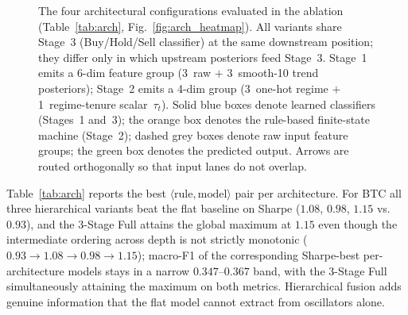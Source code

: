 \documentclass[conference]{IEEEtran}
\begin{document}
\begin{figure}[!tb]
\caption{The four architectural configurations evaluated in the ablation (Table~\ref{tab:arch}, Fig.~\ref{fig:arch_heatmap}). All variants share Stage~3 (Buy/Hold/Sell classifier) at the same downstream position; they differ only in which upstream posteriors feed Stage~3. Stage~1 emits a 6-dim feature group (3~raw $+$ 3~smooth-10 trend posteriors); Stage~2 emits a 4-dim group (3~one-hot regime $+$ 1~regime-tenure scalar~$\tau_t$). Solid blue boxes denote learned classifiers (Stages~1 and~3); the orange box denotes the rule-based finite-state machine (Stage~2); dashed grey boxes denote raw input feature groups; the green box denotes the predicted output. Arrows are routed orthogonally so that input lanes do not overlap.}
\label{fig:arch_diagram}
\end{figure}

Table~\ref{tab:arch} reports the best $\langle\text{rule}, \text{model}\rangle$ pair per architecture. For BTC all three hierarchical variants beat the flat baseline on Sharpe ($1.08$, $0.98$, $1.15$ vs.~$0.93$), and the 3-Stage Full attains the global maximum at $1.15$ even though the intermediate ordering across depth is not strictly monotonic ($0.93 \to 1.08 \to 0.98 \to 1.15$); macro-F1 of the corresponding Sharpe-best per-architecture models stays in a narrow $0.347$--$0.367$ band, with the 3-Stage Full simultaneously attaining the maximum on both metrics. Hierarchical fusion adds genuine information that the flat model cannot extract from oscillators alone.
\end{document}
